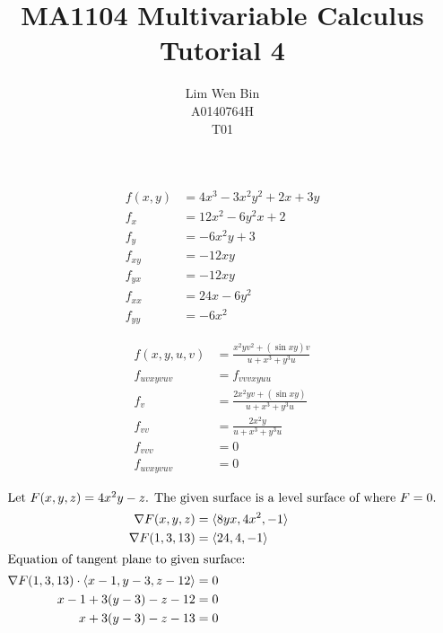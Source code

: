 \documentclass[12pt]{article}
\newenvironment{problem}[2][Problem]{\begin{trivlist}
\item[\hskip \labelsep {\bfseries #1}\hskip \labelsep {\bfseries #2.}]}{\end{trivlist}}
\begin{document}
\title{MA1104 Multivariable Calculus Tutorial 4}
\author{Lim Wen Bin \\
A0140764H\\
T01}
\maketitle

\begin{problem}{1.a}
\end{problem}
\begin{align*}
	f(x,y) &= 4x^3 -3x^2y^2 +2x +3y \\
	f_x &= 12x^2 -6y^2x +2\\
	f_y &= -6x^2y +3 \\
	f_{xy} &= -12xy\\
	f_{yx} &= -12xy \\
	f_{xx} &= 24x -6y^2\\
	f_{yy} &= -6x^2
\end{align*}
\filbreak

\begin{problem}{1.b}
\end{problem}
\begin{align*}
	f(x,y,u,v) &= \frac{ x^2yv^2 +(\sin xy)v } { u +x^3 +y^3u } \\
	f_{uvxyvuv} &= f_{vvvxyuu} \\
	f_v &= \frac{ 2x^2yv +(\sin xy) } { u +x^3 +y^3u } \\
	f_{vv} &= \frac{ 2x^2y } { u +x^3 +y^3u } \\
	f_{vvv} &= 0 \\
	f_{uvxyvuv} &= 0 
\end{align*}
\filbreak

\begin{problem}{2}
\end{problem}
\begin{align*}
	\intertext{Let $F(x,y,z) = 4x^2y -z$. The given surface is a level surface of where 
	$F = 0$.}
	\nabla F(x,y,z) &= \langle 8yx, 4x^2, -1 \rangle \\
	\nabla F(1,3,13) &= \langle 24, 4, -1 \rangle \\
	\intertext{Equation of tangent plane to given surface:}
	\nabla F(1,3,13) \cdot \langle x-1, y-3, z-12 \rangle &= 0\\
	x-1 + 3(y-3) -z-12 &= 0\\
	x+ 3(y-3) -z-13 &= 0\\
\end{align*}
\filbreak
\end{document}
